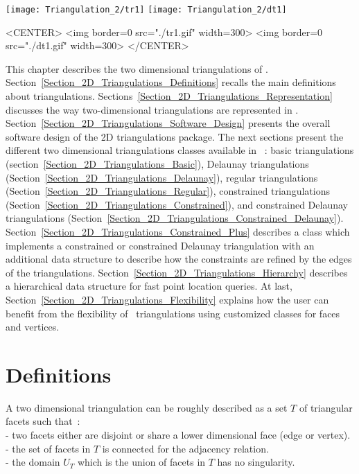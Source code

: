 \newcommand{\triangulationcomment}[1]{}


\begin{ccTexOnly}
\begin{center}
\texttt{[image: Triangulation\_2/tr1]} \hspace*{1cm} 
\texttt{[image: Triangulation\_2/dt1]} 
\end{center}
\end{ccTexOnly}
\begin{ccHtmlOnly}
<CENTER>
<img border=0 src="./tr1.gif" width=300>
<img border=0 src="./dt1.gif" width=300>
</CENTER>
\end{ccHtmlOnly}

This chapter describes the two dimensional triangulations
of \cgal. 
Section~\ref{Section_2D_Triangulations_Definitions} recalls the
main definitions about triangulations.
Sections~\ref{Section_2D_Triangulations_Representation} discusses
the way two-dimensional triangulations are represented in \cgal.
Section~\ref{Section_2D_Triangulations_Software_Design} presents
the overall software
design of the 2D triangulations package. 
The next sections present the different two dimensional triangulations classes
available in  \cgal~: 
basic triangulations (section~\ref{Section_2D_Triangulations_Basic}),
Delaunay triangulations
(Section~\ref{Section_2D_Triangulations_Delaunay}),
regular triangulations
(Section~\ref{Section_2D_Triangulations_Regular}),
constrained triangulations
(Section~\ref{Section_2D_Triangulations_Constrained}),
and constrained Delaunay triangulations
(Section~\ref{Section_2D_Triangulations_Constrained_Delaunay}).
Section~\ref{Section_2D_Triangulations_Constrained_Plus}
describes a class which implements a constrained or
constrained Delaunay triangulation  with
an additional data structure 
to describe how the constraints are refined 
by the edges of the triangulations.
Section~\ref{Section_2D_Triangulations_Hierarchy}
describes a hierarchical data structure for
fast point location queries.
At last, Section~\ref{Section_2D_Triangulations_Flexibility} 
explains how the user can  benefit  from the flexibility 
of  \cgal\ triangulations using customized classes for faces
and vertices.

\section{Definitions\label{Section_2D_Triangulations_Definitions}}

A two dimensional triangulation can be roughly described as a set $T$
of triangular facets such that~:\\
- two facets either are  disjoint or share a lower dimensional
face (edge or vertex).\\
- the set of facets in  $T$ is connected for the adjacency relation. \\
- the  domain $U_T$  which is the union
of facets in $T$ has no singularity.


